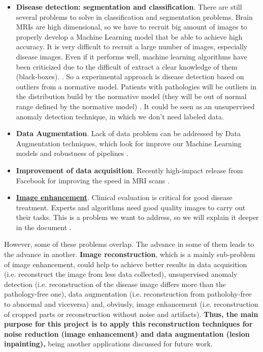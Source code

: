 \begin{itemize}
    \item \textbf{Disease detection: segmentation and classification}. There are still several problems to solve in classification and segmentation problems. Brain MRIs are high dimensional, so we have to recruit big amount of images to properly develop a Machine Learning model that be able to achieve high accuracy. It is very difficult to recruit a large number of images, especially disease images. Even if it performs well, machine learning algorithms have been criticized due to the difficult of extract a clear knowledge of them (black-boxes).  \cite{myronenko20183d}. So a experimental approach is disease detection based on outliers from a normative model. Patients with pathologies will be outliers in the distribution build by the normative model (they will be out of normal range defined by the normative model) \cite{marquand2016normative} \cite{mourao2011outlier}. It could be seen as an unsupervised anomaly detection technique, in which we don't need labeled data.
    \item \textbf{Data Augmentation}. Lack of data problem can be addressed by Data Augmentation techniques, which look for improve our Machine Learning models \cite{GanDataAugment2018} and robustness of pipelines \cite{2020inpainting}.
    \item \textbf{Improvement of data acquisition}. Recently high-impact  release from Facebook for improving the speed in MRI scans \cite{fastmri}.
    \item \underline{\textbf{Image enhancement}}. Clinical evaluation is critical for good disease treatment. Experts and algorithms need good quality images to carry out their tasks. This is a problem we want to address, so we will explain it deeper in the document \cite{tamada2020review} \cite{myronenko20183d}. 
\end{itemize}

However, some of these problems overlap. The advance in some of them leads to the advance in another. \textbf{Image reconstruction}, which is a mainly sub-problem of image enhancement, could help to achieve better results in data acquisition (i.e. reconstruct the image from less data collected), unsupervised anomaly detection (i.e. reconstruction of the disease image differs more than the pathology-free one), data augmentation (i.e. reconstruction from patholohy-free to abnormal and viceversa) and, obviusly, image enhancement (i.e. reconstruction of cropped parts or reconstruction without noise and artifacts). \textbf{Thus, the main purpose for this project is to apply this reconstruction techniques for noise reduction (image enhancement) and data augmentation (lesion inpainting),} being another applications discussed for future work.

